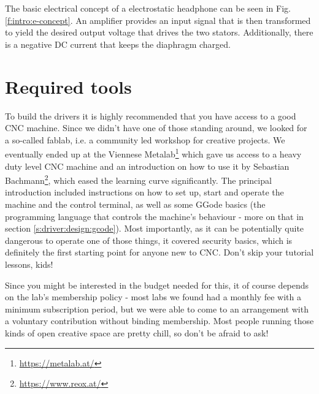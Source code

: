 \documentclass{article}
\begin{document}
The basic electrical concept of a electrostatic headphone can be seen in Fig. \ref{f:intro:e-concept}. An amplifier provides an input signal that is then transformed to yield the desired output voltage that drives the two stators. Additionally, there is a negative DC current that keeps the diaphragm charged.

\section{Required tools}
\label{s:tools}

To build the drivers it is highly recommended that you have access to a good CNC machine. Since we didn't have one of those standing around, we looked for a so-called fablab, i.e. a community led workshop for creative projects. We eventually ended up at the Viennese Metalab\footnote{\url{https://metalab.at/}} which gave us access to a heavy duty level CNC machine and an introduction on how to use it by Sebastian Bachmann\footnote{\url{https://www.reox.at/}}, which eased the learning curve significantly. The principal introduction included instructions on how to set up, start and operate the machine and the control terminal, as well as some GGode basics (the programming language that controls the machine's behaviour - more on that in section \ref{s:driver:design:gcode}). Most importantly, as it can be potentially quite dangerous to operate one of those things, it covered security basics, which is definitely the first starting point for anyone new to CNC. Don't skip your tutorial lessons, kids!

Since you might be interested in the budget needed for this, it of course depends on the lab's membership policy - most labs we found had a monthly fee with a minimum subscription period, but we were able to come to an arrangement with a voluntary contribution without binding membership. Most people running those kinds of open creative space are pretty chill, so don't be afraid to ask!
\end{document}
